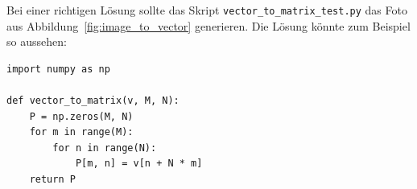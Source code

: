 \begin{losung*}
	Bei einer richtigen Lösung sollte das Skript \texttt{vector\_to\_matrix\_test.py} das Foto aus Abbildung~\ref{fig:image_to_vector} generieren.
	Die Lösung könnte zum Beispiel so aussehen:
\begin{lstlisting}[style=python]
import numpy as np

def vector_to_matrix(v, M, N):
	P = np.zeros(M, N)
	for m in range(M):
		for n in range(N):
			P[m, n] = v[n + N * m]
	return P
\end{lstlisting}
\end{losung*}